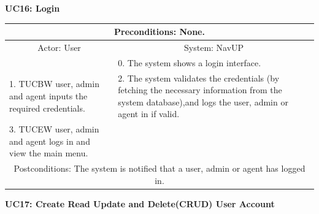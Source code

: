 \documentclass{article}
\begin{document}
				\vspace{5mm}
                \begin{flushleft}
                \textbf{UC16: Login}\\
				\end{flushleft}
        		\centering		
       		 \small
       		 \begin{tabular}{|p{6cm}|p{6cm}|}
       		 \hline
       		 \multicolumn{2}{c}{Preconditions: None.} \\
       		 \hline
       		\multicolumn{1}{c}{Actor: User} & \multicolumn{1}{c}{ System: NavUP} \\
        		\hline
       		 &0.	The system shows a login interface.\\
       		 \hline
       		1.	TUCBW user, admin and agent inputs the required credentials.
 &2.	The system validates the credentials (by fetching the necessary information from the system database),and logs the user, admin or agent in if valid.
\\
        		\hline
       		3.	TUCEW user, admin and agent logs in and view the main menu.&\\
       		 \hline
        		\multicolumn{2}{c}{Postconditions: The system is notified that a user, admin or agent has logged in. } \\
        		\hline
        \end{tabular} 
         \newpage
				\vspace{5mm}
                \textbf{UC17: Create Read Update and Delete(CRUD) User Account}\\
                \vspace{3mm}
        		\centering
      		 \small
\end{document}
